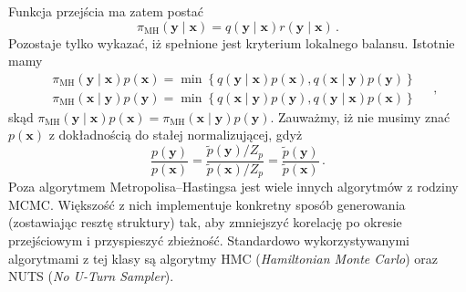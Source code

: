 \documentclass{myclass}
\numberwithin{equation}{subsection}
\begin{document}
Funkcja przejścia ma zatem postać
\begin{equation}
    \pi_\text{MH}(\bm{y}\mid\bm{x}) = q(\bm{y} \mid \bm{x}) r(\bm{y} \mid \bm{x})\,.
\end{equation}
Pozostaje tylko wykazać, iż spełnione jest kryterium lokalnego balansu. Istotnie mamy
\begin{equation}
    \begin{split}
        &\pi_\text{MH}(\bm{y}\mid\bm{x})p(\bm{x}) = \min\left\{q(\bm{y}\mid\bm{x})p(\bm{x}), q(\bm{x}\mid\bm{y})p(\bm{y})\right\}\\
        &\pi_\text{MH}(\bm{x}\mid\bm{y})p(\bm{y}) = \min\left\{q(\bm{x}\mid\bm{y})p(\bm{y}), q(\bm{y}\mid\bm{x})p(\bm{x})\right\}
    \end{split}\quad,
\end{equation}
skąd \(\pi_\text{MH}(\bm{y}\mid\bm{x})p(\bm{x}) = \pi_\text{MH}(\bm{x}\mid\bm{y})p(\bm{y})\).
Zauważmy, iż nie musimy znać \(p(\bm{x})\) z dokładnością do stałej normalizującej, gdyż
\begin{equation}
    \frac{p(\bm{y})}{p(\bm{x})} = \frac{\tilde{p}(\bm{y})/Z_p}{\tilde{p}(\bm{x})/Z_p} =  \frac{\tilde{p}(\bm{y})}{\tilde{p}(\bm{x})}\,.
\end{equation}
Poza algorytmem Metropolisa--Hastingsa jest wiele innych algorytmów z rodziny MCMC. Większość z nich
implementuje konkretny sposób generowania (zostawiając resztę struktury) tak, aby zmniejszyć
korelację po okresie przejściowym i przyspieszyć zbieżność. Standardowo wykorzystywanymi algorytmami
z tej klasy są algorytmy HMC (\textit{Hamiltonian Monte Carlo}) oraz NUTS (\textit{No U-Turn
Sampler}).

    
\end{document}
